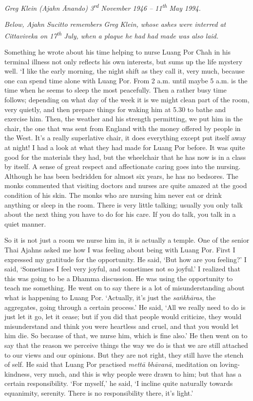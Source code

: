 
\emph{Greg Klein (Ajahn Ānando) 3\textsuperscript{rd} November 1946 -- 11\textsuperscript{th} May 1994.}

\emph{Below, Ajahn Sucitto remembers Greg Klein, whose ashes were interred at
Cittaviveka on 17\textsuperscript{th} July, when a plaque he had had
made was also laid.}

Something he wrote about his time helping to nurse Luang Por Chah in his
terminal illness not only reflects his own interests, but sums up the
life mystery well. `I like the early morning, the night shift as they
call it, very much, because one can spend time alone with Luang Por. 
From 2 a.m. until maybe 5 a.m. is the time when he seems to sleep the
most peacefully. Then a rather busy time follows; depending on what day
of the week it is we might clean part of the room, very quietly, and
then prepare things for waking him at 5.30 to bathe and exercise him. 
Then, the weather and his strength permitting, we put him in the chair, 
the one that was sent from England with the money offered by people in
the West. It's a really superlative chair, it does everything except put
itself away at night! I had a look at what they had made for Luang Por
before. It was quite good for the materials they had, but the wheelchair
that he has now is in a class by itself. A sense of great respect and
affectionate caring goes into the nursing. Although he has been
bedridden for almost six years, he has no bedsores. The monks commented
that visiting doctors and nurses are quite amazed at the good condition
of his skin. The monks who are nursing him never eat or drink anything
or sleep in the room. There is very little talking; usually you only
talk about the next thing you have to do for his care. If you do talk, 
you talk in a quiet manner.

So it is not just a room we nurse him in, it is actually a temple. One
of the senior Thai Ajahns asked me how I was feeling about being with
Luang Por. First I expressed my gratitude for the opportunity. He said, 
`But how are you feeling?' I said, `Sometimes I feel very joyful, and
sometimes not so joyful.' I realized that this was going to be a Dhamma
discussion. He was using the opportunity to teach me something. He went
on to say there is a lot of misunderstanding about what is happening to
Luang Por. `Actually, it's just the \emph{saṅkhāras}, the aggregates, going
through a certain process.' He said, `All we really need to do is just
let it go, let it cease; but if you did that people would criticize, 
they would misunderstand and think you were heartless and cruel, and
that you would let him die. So because of that, we nurse him, which is
fine also.' He then went on to say that the reason we perceive things
the way we do is that we are still attached to our views and our
opinions. But they are not right, they still have the stench of self. He
said that Luang Por practised \emph{mettā bhāvanā}, meditation on
loving-kindness, very much, and this is why people were drawn to him; 
but that has a certain responsibility. `For myself,' he said, `I incline
quite naturally towards equanimity, serenity. There is no responsibility
there, it's light.'

